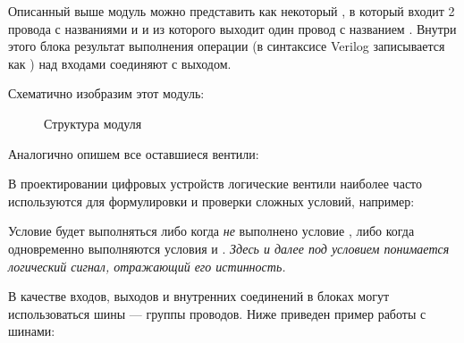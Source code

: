 \noindent
\begin{minipage}{\linewidth}
 
\end{minipage}

\par{Описанный выше модуль можно представить как некоторый , в который входит 2 провода с названиями \emph{} и \emph{} и из которого выходит один провод с названием \emph{}. Внутри этого блока результат выполнения операции  (в синтаксисе Verilog записывается как \quotes{\&}) над входами соединяют с выходом.}
\par{Схематично изобразим этот модуль:}

\begin{figure}[H]
  \centering
  \def\svgwidth{\columnwidth}
  
  \caption{Структура модуля }
\end{figure}

\par{Аналогично опишем все оставшиеся вентили:}

\noindent
\begin{minipage}{\linewidth}
  
\end{minipage}

\noindent
\begin{minipage}{\linewidth}
  
\end{minipage}

\noindent
\begin{minipage}{\linewidth}
  
\end{minipage}

\par{В проектировании цифровых устройств логические вентили наиболее часто используются для формулировки и проверки сложных условий, например:}



\par{Условие будет выполняться либо когда \emph{не} выполнено условие \emph{}, либо когда одновременно выполняются условия \emph{} и \emph{}. \emph{Здесь и далее под условием понимается логический сигнал, отражающий его истинность.}}
\par{В качестве входов, выходов и внутренних соединений в блоках могут использоваться шины — группы проводов. Ниже приведен пример работы с шинами:}

